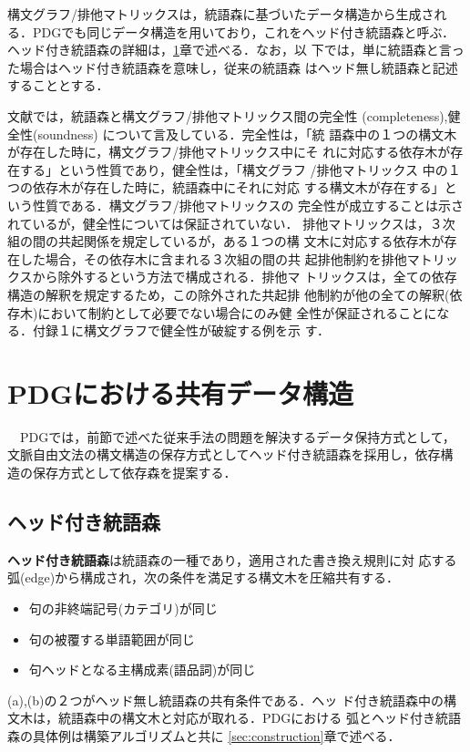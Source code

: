 構文グラフ/排他マトリックスは，統語森に基づいたデータ構造から生成され
る．PDGでも同じデータ構造を用いており，これをヘッド付き統語森と呼ぶ．
ヘッド付き統語森の詳細は，\ref{sec:datastructure}章で述べる．なお，以
下では，単に統語森と言った場合はヘッド付き統語森を意味し，従来の統語森
はヘッド無し統語森と記述することとする．


文献\cite{Seo89}では，統語森と構文グラフ/排他マトリックス間の完全性
(completeness),健全性(soundness) について言及している．完全性は，「統
語森中の１つの構文木が存在した時に，構文グラフ/排他マトリックス中にそ
れに対応する依存木が存在する」という性質であり，健全性は，「構文グラフ
/排他マトリックス 中の１つの依存木が存在した時に，統語森中にそれに対応
する構文木が存在する」という性質である．構文グラフ/排他マトリックスの
完全性が成立することは示されているが，健全性については保証されていない．
排他マトリックスは，３次組の間の共起関係を規定しているが，ある１つの構
文木に対応する依存木が存在した場合，その依存木に含まれる３次組の間の共
起排他制約を排他マトリックスから除外するという方法で構成される．排他マ
トリックスは，全ての依存構造の解釈を規定するため，この除外された共起排
他制約が他の全ての解釈(依存木)において制約として必要でない場合にのみ健
全性が保証されることになる．付録１に構文グラフで健全性が破綻する例を示
す．

\section{PDGにおける共有データ構造}\label{sec:datastructure}

　PDGでは，前節で述べた従来手法の問題を解決するデータ保持方式として，
文脈自由文法の構文構造の保存方式としてヘッド付き統語森を採用し，依存構
造の保存方式として依存森を提案する．

\subsection{ヘッド付き統語森}

{\bf ヘッド付き統語森}は統語森の一種であり，適用された書き換え規則に対
応する弧(edge)から構成され，次の条件を満足する構文木を圧縮共有する．
\begin{itemize}
\item[(a)]句の非終端記号(カテゴリ)が同じ
\item[(b)]句の被覆する単語範囲が同じ
\item[(c)]句ヘッドとなる主構成素(語品詞)が同じ
\end{itemize}
(a),(b)の２つがヘッド無し統語森の共有条件である\cite{Schiehlen96}．ヘッ
ド付き統語森中の構文木は，統語森中の構文木と対応が取れる．PDGにおける
弧とヘッド付き統語森の具体例は構築アルゴリズムと共に
\ref{sec:construction}章で述べる．

